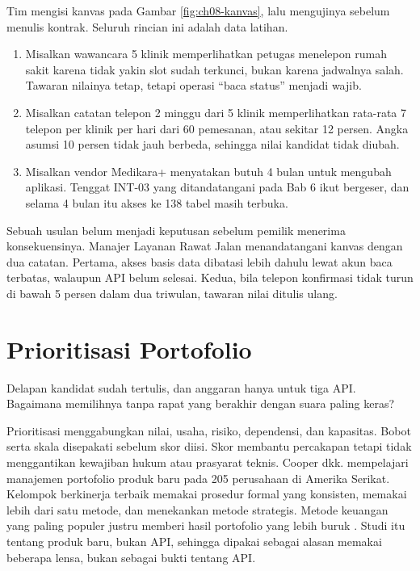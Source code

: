 \begin{kasus}[title={Kasus Medikara Health: Menguji Kanvas API-01 pada Lima Klinik}]
Tim mengisi kanvas pada Gambar \ref{fig:ch08-kanvas}, lalu mengujinya sebelum menulis kontrak. Seluruh rincian ini adalah data latihan.
\begin{enumerate}
  \item Misalkan wawancara 5 klinik memperlihatkan petugas menelepon rumah sakit karena tidak yakin slot sudah terkunci, bukan karena
        jadwalnya salah. Tawaran nilainya tetap, tetapi operasi ``baca status'' menjadi wajib.
  \item Misalkan catatan telepon 2 minggu dari 5 klinik memperlihatkan rata-rata 7 telepon per klinik per hari dari 60 pemesanan, atau
        sekitar 12 persen. Angka asumsi 10 persen tidak jauh berbeda, sehingga nilai kandidat tidak diubah.
  \item Misalkan vendor Medikara+ menyatakan butuh 4 bulan untuk mengubah aplikasi. Tenggat INT-03 yang ditandatangani pada Bab 6 ikut
        bergeser, dan selama 4 bulan itu akses ke 138 tabel masih terbuka.
\end{enumerate}

Sebuah usulan belum menjadi keputusan sebelum pemilik menerima konsekuensinya. Manajer Layanan Rawat Jalan menandatangani kanvas dengan
dua catatan. Pertama, akses basis data dibatasi lebih dahulu lewat akun baca terbatas, walaupun API belum selesai. Kedua, bila
telepon konfirmasi tidak turun di bawah 5 persen dalam dua triwulan, tawaran nilai ditulis ulang.
\end{kasus}

\section{Prioritisasi Portofolio}

Delapan kandidat sudah tertulis, dan anggaran hanya untuk tiga API. Bagaimana memilihnya tanpa rapat yang berakhir dengan suara
paling keras?

Prioritisasi menggabungkan nilai, usaha, risiko, dependensi, dan kapasitas. Bobot serta skala disepakati sebelum skor diisi. Skor
membantu percakapan tetapi tidak menggantikan kewajiban hukum atau prasyarat teknis. Cooper dkk. mempelajari manajemen portofolio
produk baru pada 205 perusahaan di Amerika Serikat. Kelompok berkinerja terbaik memakai prosedur formal yang konsisten, memakai lebih
dari satu metode, dan menekankan metode strategis. Metode keuangan yang paling populer justru memberi hasil portofolio yang lebih buruk
\cite{c08-cooper1999}. Studi itu tentang produk baru, bukan API, sehingga dipakai sebagai alasan memakai beberapa lensa, bukan sebagai
bukti tentang API.

